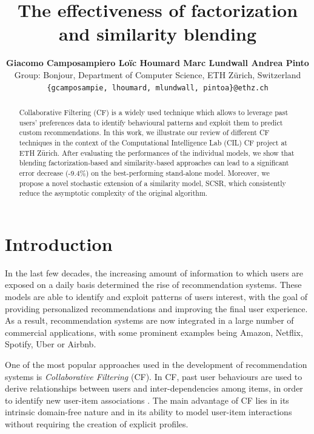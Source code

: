 \documentclass[sigconf]{acmart}
\title{
The effectiveness of factorization and similarity blending
}
\author{
\textbf{
Giacomo Camposampiero \enskip 
Loïc Houmard \enskip 
Marc Lundwall \enskip 
Andrea Pinto \\
}
\vspace{0.1cm}
Group: Bonjour, Department of Computer Science, ETH Zürich, Switzerland\\ 
\vspace{0.1cm}
\normalsize{\texttt{\{gcamposampie, lhoumard, mlundwall, pintoa\}@ethz.ch}}
\vspace{0.5cm}
}
\begin{document}
\begin{abstract}
{
\small
Collaborative Filtering (CF) is a widely used technique which allows to leverage past users' preferences data to identify behavioural patterns and exploit them to predict custom recommendations.
In this work, we illustrate our review of different CF techniques in the context of the Computational Intelligence Lab (CIL) CF project at ETH Zürich. After evaluating the performances of the individual models, we show that blending factorization-based and similarity-based approaches can lead to a significant error decrease (-9.4\%) on the best-performing stand-alone model.  
Moreover, we propose a novel stochastic extension of a similarity model, SCSR, which consistently reduce the asymptotic complexity of the original algorithm.
}
\end{abstract}

\maketitle

\section{Introduction}
In the last few decades, the increasing amount of information to which users are exposed on a daily basis determined the rise of recommendation systems. These models are able to identify and exploit patterns of users interest, with the goal of providing personalized recommendations and improving the final user experience. As a result, recommendation systems are now integrated in a large number of commercial applications, with some prominent examples being Amazon, Netflix, Spotify, Uber or Airbnb.

One of the most popular approaches used in the development of recommendation systems is \textit{Collaborative Filtering} (CF). In CF, past user behaviours are used to derive relationships between users and inter-dependencies among items, in order to identify new user-item associations \cite{Koren09matrixfactorization}. The main advantage of CF lies in its intrinsic domain-free nature and in its ability to model user-item interactions without requiring the creation of explicit profiles.%
\end{document}
